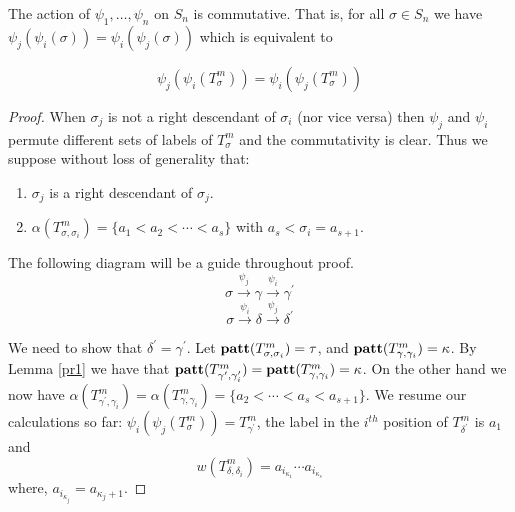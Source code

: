 \begin{theorem}
\label{thcomm}
The action of $\psi_1,\ldots, \psi_n$ on $S_n$ is commutative.
That is, for all $\sigma\in S_n$ we have
$\psi_j(\psi_i(\sigma)) = \psi_i(\psi_j(\sigma))$ which is equivalent to

$$
\psi_j(\psi_i(T_\sigma^m)) = \psi_i(\psi_j(T^m_\sigma))
$$
\end{theorem}
\begin{proof}
When $\sigma_j$ is not a right descendant of $\sigma_i$
(nor vice versa) then $\psi_j$ and $\psi_i$ permute different
sets of labels of $T_\sigma^m$ and the commutativity is clear.
Thus we suppose without loss of generality that:
\begin{enumerate}
\item $\sigma_j$ is a right descendant of $\sigma_j$.
\item $\alpha(T^m_{\sigma,\sigma_i}) = \{a_1 < a_2 < \cdots < a_s\}$
with $a_s < \sigma_i=a_{s+1}$.
\end{enumerate}
The following diagram will be a guide throughout proof.
$$
\sigma \stackrel{\psi_j}{\longrightarrow}   \gamma
\stackrel {\psi_i}{\longrightarrow} \gamma^\prime
$$
$$
\sigma \stackrel{\psi_i}{\longrightarrow}\delta  \stackrel{\psi_j}{\longrightarrow} \delta^\prime
$$

We need to show that $\delta^\prime = \gamma^\prime$.
Let ${\bf patt}(T_{\sigma,\sigma_i}^m) =  \tau $,
and ${\bf patt}(T_{\gamma,\gamma_i}^m) = \kappa$.
By Lemma \ref{pr1} we have that 
${\bf patt}(T^m_{\gamma^\prime,\gamma^\prime_i}) = {\bf patt}(T^m_{\gamma,\gamma_i})=\kappa$.
On the other hand we now have 
$\alpha(T^m_{\gamma^\prime,\gamma_i})=\alpha(T^m_{\gamma,\gamma_i})= \{a_2 < \cdots < a_s < a_{s+1} \}$.
We resume our calculations so far:
$\psi_i(\psi_j(T_{\sigma}^m)) = T^m_{\gamma^\prime}$, the label in the 
$i^{th}$ position of $T_{\delta^\prime}^m$ is $a_1$ and
\begin{equation}
w(T_{\delta,\delta_i}^m) = a_{i_{\kappa_1}}\cdots  a_{i_{\kappa_s}}
\end{equation}
where, $a_{i_{\kappa_j}} = a_{\kappa_j+1}$.


\end{proof}
